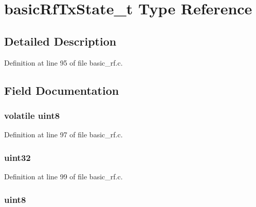 \hypertarget{typebasic_rf_tx_state__t}{
\section{basicRfTxState\_\-t Type Reference}
\label{typebasic_rf_tx_state__t}
}
\par
\par


\subsection{Detailed Description}


Definition at line 95 of file basic\_\-rf.c.



\subsection{Field Documentation}
\hypertarget{typebasic_rf_tx_state__t_afd39092a87c139f4d760ffb0c1d6cdc0}{
\subsubsection[{ackReceived}]{ {\bfseries volatile uint8 } }}
\label{typebasic_rf_tx_state__t_afd39092a87c139f4d760ffb0c1d6cdc0}


Definition at line 97 of file basic\_\-rf.c.

\hypertarget{typebasic_rf_tx_state__t_abaad7c81f36e771a0d8cd3282e8540ba}{
\subsubsection[{frameCounter}]{ {\bfseries uint32 } }}
\label{typebasic_rf_tx_state__t_abaad7c81f36e771a0d8cd3282e8540ba}


Definition at line 99 of file basic\_\-rf.c.

\hypertarget{typebasic_rf_tx_state__t_ace5201fe82e7a8c63f697559ed54c98c}{
\subsubsection[{receiveOn}]{ {\bfseries uint8 } }}
\label{typebasic_rf_tx_state__t_ace5201fe82e7a8c63f697559ed54c98c}


